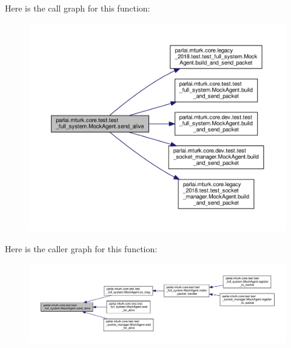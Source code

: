 Here is the call graph for this function\+:
\nopagebreak
\begin{figure}[H]
\begin{center}
\leavevmode
\includegraphics[width=350pt]{classparlai_1_1mturk_1_1core_1_1test_1_1test__full__system_1_1MockAgent_a7a0ba09a58ea21ac86db4b501c392a33_cgraph}
\end{center}
\end{figure}
Here is the caller graph for this function\+:
\nopagebreak
\begin{figure}[H]
\begin{center}
\leavevmode
\includegraphics[width=350pt]{classparlai_1_1mturk_1_1core_1_1test_1_1test__full__system_1_1MockAgent_a7a0ba09a58ea21ac86db4b501c392a33_icgraph}
\end{center}
\end{figure}
\mbox{\label{classparlai_1_1mturk_1_1core_1_1test_1_1test__full__system_1_1MockAgent_a42f7589517cdf4c6a10b9a80e9afea1a}} 
